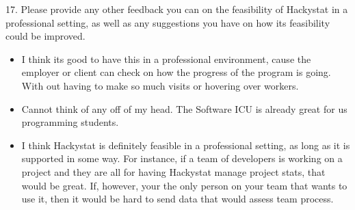\documentclass[11pt]{article}
\begin{document}
17. Please provide any other feedback you can on the feasibility of Hackystat in a professional setting, as well as any suggestions you have on how its feasibility could be improved.
\begin{itemize}
\item I think its good to have this in a professional environment, cause the employer or client  can check on how the progress of the program is going. With out having to make so much visits or hovering over workers.
\item Cannot think of any off of my head.  The Software ICU is already great for us programming students.  
\item I think Hackystat is definitely feasible in a professional setting, as long as it is supported in some way. For instance, if a team of developers is working on a project and they are all for having Hackystat manage project stats, that would be great. If, however, your the only person on your team that wants to use it, then it would be hard to send data that would assess team process.


\end{itemize}
\end{document}

